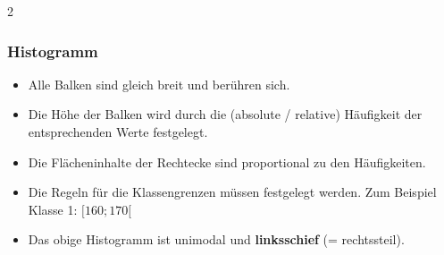 \begin{multicols}{2}
\headerUndFooterJedeSeite{}


\headerUndFooterJedeSeite{}

\subsubsection*{Histogramm}
\headerUndFooterJedeSeite{}

\begin{itemize}
\item Alle Balken sind gleich breit und berühren sich.
\item Die Höhe der Balken wird durch die (absolute / relative) Häufigkeit der entsprechenden
  Werte festgelegt.
\item Die Flächeninhalte der Rechtecke sind proportional
  zu den Häufigkeiten.
\item Die Regeln für die Klassengrenzen müssen festgelegt werden. Zum
  Beispiel Klasse 1: $[160; 170[$
\item Das obige Histogramm ist unimodal und \textbf{linksschief} (= rechtssteil).
\end{itemize}



\end{multicols}


